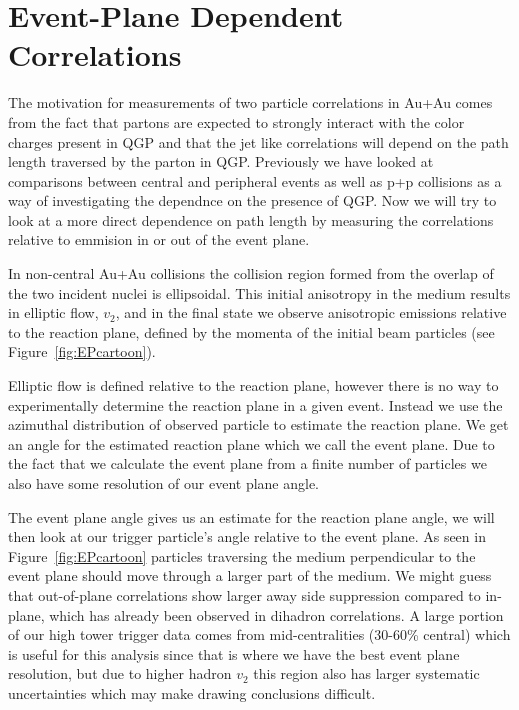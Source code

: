 \section{Event-Plane Dependent Correlations}

The motivation for measurements of two particle correlations in Au+Au comes from the fact that partons are expected to strongly interact with the color charges present in QGP and that the jet like correlations will depend on the path length traversed by the parton in QGP. Previously we have looked at comparisons between central and peripheral events as well as p+p collisions as a way of investigating the dependnce on the presence of QGP. Now we will try to look at a more direct dependence on path length by measuring the correlations relative to emmision in or out of the event plane.

In non-central Au+Au collisions the collision region formed from the overlap of the two incident nuclei is ellipsoidal. This initial anisotropy in the medium results in elliptic flow, $v_2$, and in the final state we observe anisotropic emissions relative to the reaction plane, defined by the momenta of the initial beam particles (see Figure~\ref{fig:EPcartoon}). 

Elliptic flow is defined relative to the reaction plane, however there is no way to experimentally determine the reaction plane in a given event. Instead we use the azimuthal distribution of observed particle to estimate the reaction plane. We get an angle for the estimated reaction plane which we call the event plane. Due to the fact that we calculate the event plane from a finite number of particles we also have some resolution of our event plane angle.

The event plane angle gives us an estimate for the reaction plane angle, we will then look at our trigger particle's angle relative to the event plane. As seen in Figure~\ref{fig:EPcartoon} particles traversing the medium perpendicular to the event plane should move through a larger part of the medium. We might guess that out-of-plane correlations show larger away side suppression compared to in-plane, which has already been observed in dihadron correlations. A large portion of our high tower trigger data comes from mid-centralities (30-60\% central) which is useful for this analysis since that is where we have the best event plane resolution, but due to higher hadron $v_2$ this region also has larger systematic uncertainties which may make drawing conclusions difficult.

